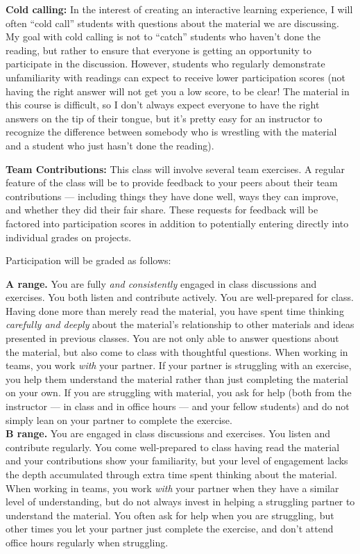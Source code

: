 \documentclass[12pt]{article}
\begin{document}
\textbf{Cold calling:} In the interest of creating an interactive learning experience, I will often ``cold call'' students with questions about the material we are discussing. My goal with cold calling is not to ``catch'' students who haven't done the reading, but rather to ensure that everyone is getting an opportunity to participate in the discussion. However, students who regularly demonstrate unfamiliarity with readings can expect to receive lower participation scores (not having the right answer will not get you a low score, to be clear! The material in this course is difficult, so I don't always expect everyone to have the right answers on the tip of their tongue, but it's pretty easy for an instructor to recognize the difference between somebody who is wrestling with the material and a student who just hasn't done the reading).

\textbf{Team Contributions:} This class will involve several team exercises. A regular feature of the class will be to provide feedback to your peers about their team contributions — including things they have done well, ways they can improve, and whether they did their fair share. These requests for feedback will be factored into participation scores in addition to potentially entering directly into individual grades on projects. 

Participation will be graded as follows:

\textbf{A range.}  You are fully \emph{and consistently} engaged in class discussions and exercises.  You both listen and contribute actively.  You are well-prepared for class.  Having done more than merely read the material, you have spent time thinking \emph{carefully and deeply} about the material's relationship to other materials and ideas presented in previous classes. You are not only able to answer questions about the material, but also come to class with thoughtful questions.  When working in teams, you work \emph{with} your partner. If your partner is struggling with an exercise, you help them understand the material rather than just completing the material on your own. If you are struggling with material, you ask for help (both from the instructor — in class and in office hours — and your fellow students) and do not simply lean on your partner to complete the exercise. \\

\textbf{B range.}  You are engaged in class discussions and exercises.  You listen and contribute regularly.  You come well-prepared to class having read the material and your contributions show your familiarity, but your level of engagement lacks the depth accumulated through extra time spent thinking about the material.  When working in teams, you work \emph{with} your partner when they have a similar level of understanding, but do not always invest in helping a struggling partner to understand the material. You often ask for help when you are struggling, but other times you let your partner just complete the exercise, and don't attend office hours regularly when struggling. \\
\end{document}
